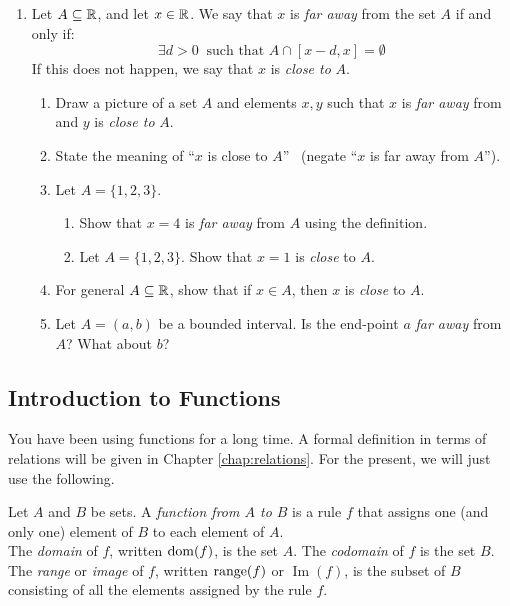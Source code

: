 \begin{exercises}{}{}
\begin{enumerate}
	
	  \item Let $A\subseteq\mathbb{R}$, and let $x\in\mathbb{R}$. We say that $x$ is \emph{far away} from the set $A$ if and only if:
	  \[
	  	\exists d>0 \ \text{ such that } A\cap[x-d,x]=\emptyset
	  \] 
		If this does not happen, we say that $x$ is \emph{close to} $A$.
  	\begin{enumerate}
			\item Draw a picture of a set $A$ and elements $x,y$ such that $x$ is \emph{far away} from and $y$ is \emph{close to} $A$. 
			\item State the meaning of ``$x$ is close to $A$'' \ (negate ``$x$ is far away from $A$'').
			\item Let $A=\{1,2,3\}$.
			\begin{enumerate}
			  \item Show that $x=4$ is \emph{far away} from $A$ using the definition.
				\item Let $A=\{1,2,3\}$. Show that $x=1$ is \emph{close} to $A$.
			\end{enumerate}
			\item For general $A\subseteq\mathbb{R}$, show that if $x\in A$, then $x$ is \emph{close} to $A$.
			\item Let $A=(a,b)$ be a bounded interval. Is the end-point $a$ \emph{far away} from $A$?  What about $b$?
  	\end{enumerate}
  	
	\end{enumerate}

\end{exercises}

\clearpage



\iffalse

\subsection{Introduction to Functions}\label{sec:func1}

You have been using functions for a long time. A formal definition in terms of relations will be given in Chapter \ref{chap:relations}. For the present, we will just use the following.

\begin{defn}{}{}
Let $A$ and $B$ be sets. A \emph{function from $A$ to $B$} is a rule $f$ that assigns one (and only one) element of $B$ to each element of $A$.\\
The \emph{domain} of $f$, written $\operatorname{dom}(f)$, is the set $A$. The \emph{codomain} of $f$ is the set $B$.\\
The \emph{range} or \emph{image} of $f$, written $\operatorname{range}(f)$ or $\operatorname{Im}(f)$, is the subset of $B$ consisting of all the elements assigned by the rule $f$.
\end{defn}

